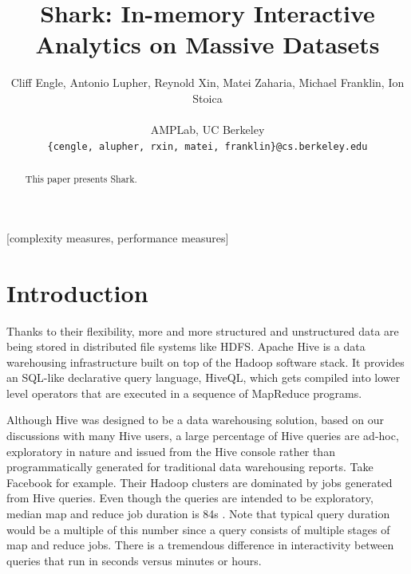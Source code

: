 \documentclass[preprint]{acm_proc_article-sp}
\begin{document}
\title{Shark: In-memory Interactive Analytics on Massive Datasets}

\author{
Cliff Engle,
Antonio Lupher,
Reynold Xin,
Matei Zaharia,
Michael Franklin,
Ion Stoica\\\\
AMPLab, UC Berkeley\\
\texttt{\{cengle, alupher, rxin, matei, franklin\}@cs.berkeley.edu}
}

\maketitle
\begin{abstract}
This paper presents Shark.
\end{abstract}

[complexity measures, performance measures]





\section{Introduction}

Thanks to their flexibility, more and more structured and unstructured data are being stored in distributed file systems like HDFS. Apache Hive is a data warehousing infrastructure built on top of the Hadoop software stack. It provides an SQL-like declarative query language, HiveQL, which gets compiled into lower level operators that are executed in a sequence of MapReduce programs. 

Although Hive was designed to be a data warehousing solution, based on our discussions with many Hive users, a large percentage of Hive queries are ad-hoc, exploratory in nature and issued from the Hive console rather than programmatically generated for traditional data warehousing reports. Take Facebook for example. Their Hadoop clusters are dominated by jobs generated from Hive \cite{hive} queries. Even though the queries are intended to be exploratory, median map and reduce job duration is 84s \cite{delay-scheduling}. Note that typical query duration would be a multiple of this number since a query consists of multiple stages of map and reduce jobs. There is a tremendous difference in interactivity between queries that run in seconds versus minutes or hours.
\end{document}
